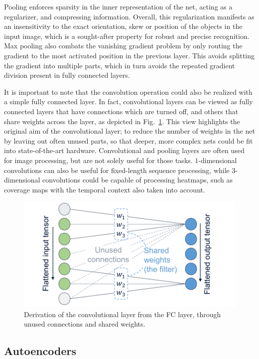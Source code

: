 			Pooling enforces sparsity in the inner representation of the net, acting as a regularizer, and compressing information.
	 		Overall, this regularization manifests as an insensitivity to the exact orientation, skew or position of the objects in the input image, which is a sought-after property for robust and precise recognition.
			Max pooling also combats the vanishing gradient problem by only routing the gradient to the most activated position in the previous layer.
			This avoids splitting the gradient into multiple parts, which in turn avoids the repeated gradient division present in fully connected layers.
			
			It is important to note that the convolution operation could also be realized with a simple fully connected layer.
			In fact, convolutional layers can be viewed as fully connected layers that have connections which are turned off, and others that share weights across the layer, as depicted in Fig.~\ref{fig:fc_conv}.
			This view highlights the original aim of the convolutional layer; to reduce the number of weights in the net by leaving out often unused parts, so that deeper, more complex nets could be fit into state-of-the-art hardware.
			Convolutional and pooling layers are often used for image processing, but are not solely useful for those tasks.
			$1$-dimensional convolutions can also be useful for fixed-length sequence processing, while $3$-dimensional convolutions could be capable of processing heatmaps, such as coverage maps with the temporal context also taken into account.
			
			\begin{figure}[ht]
				\centering
				\includegraphics[width=0.6\linewidth]{figures/02_deep_learning/fc_conv/fc_conv.pdf}
				\caption[Derivation of a convolutional layer from an FC layer]{Derivation of the convolutional layer from the FC layer, through unused connections and shared weights.}
				\label{fig:fc_conv}
			\end{figure}
			
		\subsection{Autoencoders}
			\label{cha:deep_learning:sec:ae}
		
